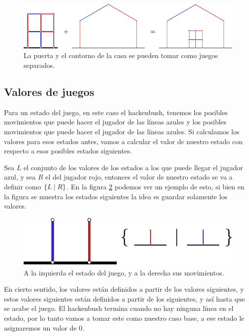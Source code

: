 \begin{figure}[h]
    \centering
    \includegraphics[width=.7\textwidth]{images/hackenbush-sum_example.pdf}
    \caption{La puerta y el contorno de la casa se pueden tomar como juegos separados.}
    \label{figure:hackenbush_sum}
\end{figure}


\subsection{Valores de juegos}

\label{subsection:game_values}

Para un estado del juego, en este caso el hackenbush, tenemos los posibles movimientos que puede hacer el jugador de las l\'ineas azules y los posibles movimientos que puede hacer el jugador de las l\'ineas azules. Si calculamos los valores para esos estados antes, vamos a calcular el valor de nuestro estado con respecto a esos posibles estados siguientes.

Sea $L$ el conjunto de los valores de los estados a los que puede llegar el jugador azul, y sea $R$ el del jugador rojo, entonces el valor de nuestro estado se va a definir como $\left\{L\;\middle|\; R\right\}$. En la figura \ref{figure:hackenbush_val} podemos ver un ejemplo de esto, si bien en la figura se muestra los estados siguientes la idea es guardar solamente los valores.

\begin{figure}[h]
    \centering
    \includegraphics[width=.7\textwidth]{images/hackenbush-val_example.pdf}
    \caption{A la izquierda el estado del juego, y a la derecha sus movimientos.}
    \label{figure:hackenbush_val}
\end{figure}

En cierto sentido, los valores est\'an definidos a partir de los valores siguientes, y estos valores siguientes est\'an definidos a partir de los siguientes, y as\'i hasta que se acabe el juego. El hackenbush termina cuando no hay ninguna l\'inea en el estado, por lo tanto vamos a tomar este como nuestro caso base, a ese estado le asignaremos un valor de $0$. 

